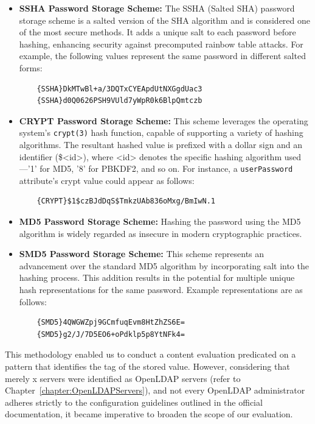 \begin{itemize}
    \item \textbf{SSHA Password Storage Scheme:} The SSHA (Salted SHA) password storage scheme is a salted version of the SHA algorithm and is considered one of the most secure methods. It adds a unique salt to each password before hashing, enhancing security against precomputed rainbow table attacks. For example, the following values represent the same password in different salted forms: 

    \begin{verbatim}
    {SSHA}DkMTwBl+a/3DQTxCYEApdUtNXGgdUac3
    {SSHA}d0Q0626PSH9VUld7yWpR0k6BlpQmtczb
    \end{verbatim}
    
    \item \textbf{CRYPT Password Storage Scheme:} This scheme leverages the operating system's \texttt{crypt(3)} hash function, capable of supporting a variety of hashing algorithms. The resultant hashed value is prefixed with a dollar sign and an identifier (\$<id>), where <id> denotes the specific hashing algorithm used—'1' for MD5, '8' for PBKDF2, and so on. For instance, a \texttt{userPassword} attribute's crypt value could appear as follows:

    \begin{verbatim}
    {CRYPT}$1$czBJdDqS$TmkzUAb836oMxg/BmIwN.1
    \end{verbatim}

    \item \textbf{MD5 Password Storage Scheme:} Hashing the password using the MD5 algorithm is widely regarded as insecure in modern cryptographic practices.

    \item \textbf{SMD5 Password Storage Scheme:} This scheme represents an advancement over the standard MD5 algorithm by incorporating salt into the hashing process. This addition results in the potential for multiple unique hash representations for the same password. Example representations are as follows:

    \begin{verbatim}
    {SMD5}4QWGWZpj9GCmfuqEvm8HtZhZS6E=
    {SMD5}g2/J/7D5EO6+oPdklp5p8YtNFk4=
    \end{verbatim}
    
\end{itemize}

This methodology enabled us to conduct a content evaluation predicated on a pattern that identifies the tag of the stored value. However, considering that merely x servers were identified as OpenLDAP servers (refer to Chapter~\ref{chapter:OpenLDAPServers}), and not every OpenLDAP administrator adheres strictly to the configuration guidelines outlined in the official documentation, it became imperative to broaden the scope of our evaluation.

